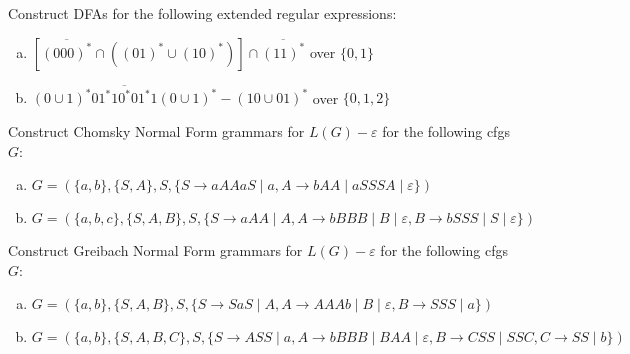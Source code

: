 \begin{exercise}{2}
    Construct DFAs for the following extended regular expressions:
    \begin{enumerate}[(a)]
        \item \(\left[\overline{{(000)}^*}\cap\left({(01)}^*\cup{(10)}^*\right)\right]\cap\overline{{(11)}^*}\) over \( \{0,1\} \)
        \item \(\overline{{(0\cup1)}^*01^*10^*01^*1{(0\cup1)}^*} - {(10\cup01)}^*\) over \( \{0, 1, 2\} \)
    \end{enumerate}
\end{exercise}

\begin{exercise}{3}
    Construct Chomsky Normal Form grammars for \(L(G)-\varepsilon \) for the following cfgs \(G\):
    \begin{enumerate}[(a)]
        \item \(G=\left(\{a, b\}, \{S, A\}, S, \{S\to aAAaS\mid a, A\to bAA\mid aSSSA\mid \varepsilon \}\right)\)
        \item \(G=\left(\{a, b, c\}, \{S, A, B\}, S, \{S\to aAA\mid A, A\to bBBB\mid B\mid \varepsilon, B\to bSSS\mid S\mid \varepsilon \}\right)\)
    \end{enumerate}
\end{exercise}

\begin{exercise}{4}
    Construct Greibach Normal Form grammars for \(L(G)-\varepsilon \) for the following cfgs \(G\):
    \begin{enumerate}[(a)]
        \item \(G=\left(\{a, b\}, \{S, A, B\}, S, \{S\to SaS\mid A, A\to AAAb\mid B\mid \varepsilon, B\to SSS\mid a \}\right)\)
        \item \(G=\left(\{a, b\}, \{S, A, B, C\}, S, \{S\to ASS\mid a, A\to bBBB\mid BAA\mid \varepsilon, B\to CSS\mid SSC, C\to SS\mid b\}\right)\)
    \end{enumerate}
\end{exercise}